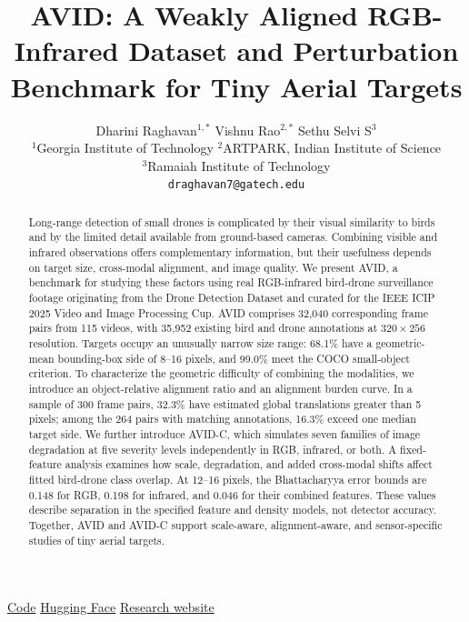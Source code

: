 \documentclass[10pt]{article}
\title{
\vspace{-1.2em}
\textbf{AVID: A Weakly Aligned RGB-Infrared Dataset and
Perturbation Benchmark for Tiny Aerial Targets}
}
\author{
Dharini Raghavan$^{1,*}$ \quad
Vishnu Rao$^{2,*}$ \quad
Sethu Selvi S$^{3}$\\[5pt]
\small
$^1$Georgia Institute of Technology \quad
$^2$ARTPARK, Indian Institute of Science\\[2pt]
\small
$^3$Ramaiah Institute of Technology\\[3pt]
\small
\texttt{draghavan7@gatech.edu}
}
\date{}
\newcommand{\codeurl}{https://github.com/rdharini2001/ICIP_2025_Data_Release}
\newcommand{\dataurl}{https://huggingface.co/datasets/Dharini24/AVID}
\newcommand{\siteurl}{https://rdharini2001.github.io/ICIP_2025_Data_Release/}
\newcommand{\dataset}{\textsc{AVID}}
\newcommand{\corrupt}{\textsc{AVID-C}}
\begin{document}
\maketitle

\begingroup
\renewcommand{\thefootnote}{\fnsymbol{footnote}}
\endgroup

\vspace{-0.7em}
\begin{center}
\small
{\color{linkblue}\faGithub}\;
\href{\codeurl}{Code}
\qquad
{\color{linkgold}\faSmileBeam}\;
\href{\dataurl}{Hugging Face}
\qquad
\href{\siteurl}{Research website}
\end{center}
\vspace{-0.3em}

\begin{abstract}
Long-range detection of small drones is complicated by their visual similarity to birds and by the limited detail available from ground-based cameras. Combining visible and infrared observations offers complementary information, but their usefulness depends on target size, cross-modal alignment, and image quality. We present \dataset{}, a benchmark for studying these factors using real RGB-infrared bird-drone surveillance footage originating from the Drone Detection Dataset and curated for the IEEE ICIP 2025 Video and Image Processing Cup. \dataset{} comprises 32,040 corresponding frame pairs from 115 videos, with 35,952 existing bird and drone annotations at $320\times256$ resolution. Targets occupy an unusually narrow size range: 68.1\% have a geometric-mean bounding-box side of 8--16 pixels, and 99.0\% meet the COCO small-object criterion. To characterize the geometric difficulty of combining the modalities, we introduce an object-relative alignment ratio and an alignment burden curve. In a sample of 300 frame pairs, 32.3\% have estimated global translations greater than 5 pixels; among the 264 pairs with matching annotations, 16.3\% exceed one median target side. We further introduce \corrupt{}, which simulates seven families of image degradation at five severity levels independently in RGB, infrared, or both. A fixed-feature analysis examines how scale, degradation, and added cross-modal shifts affect fitted bird-drone class overlap. At 12--16 pixels, the Bhattacharyya error bounds are 0.148 for RGB, 0.198 for infrared, and 0.046 for their combined features. These values describe separation in the specified feature and density models, not detector accuracy. Together, \dataset{} and \corrupt{} support scale-aware, alignment-aware, and sensor-specific studies of tiny aerial targets.

\end{abstract}
\end{document}

